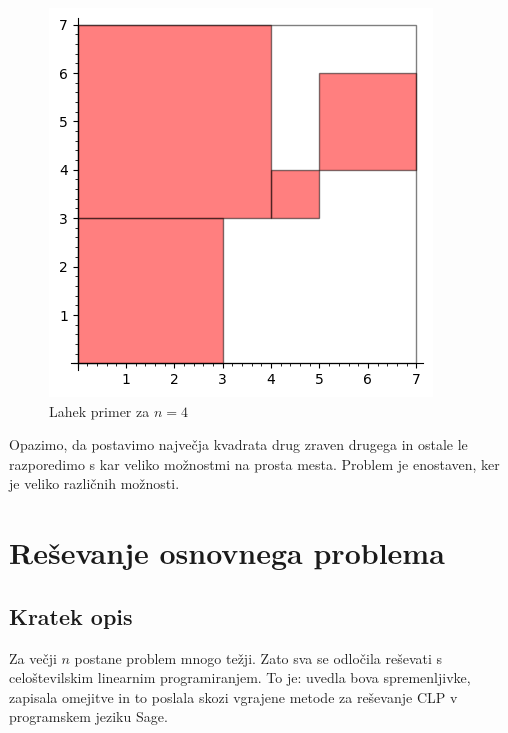 \documentclass[a4paper, 11pt]{article}
\begin{document}
\begin{figure}[H]
    \centering
    \includegraphics{prvi.png}
    \caption{Lahek primer za $n = 4$}
\end{figure}

Opazimo, da postavimo največja kvadrata drug zraven drugega in ostale le razporedimo s kar
veliko možnostmi na prosta mesta. Problem je enostaven, ker je veliko različnih možnosti.

\section{Reševanje osnovnega problema}
\subsection{Kratek opis}
Za večji $n$ postane problem mnogo težji. Zato sva se odločila reševati s celoštevilskim linearnim programiranjem.
To je: uvedla bova spremenljivke, zapisala omejitve in to poslala skozi vgrajene 
metode za reševanje CLP v programskem jeziku Sage.
\end{document}
